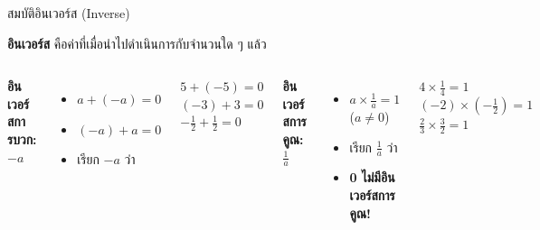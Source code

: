 \documentclass[11pt, aspectratio=169]{beamer}
\begin{document}
\begin{frame}{สมบัติอินเวอร์ส (Inverse)}
  \begin{explanation}
    \textbf{อินเวอร์ส} คือค่าที่เมื่อนำไปดำเนินการกับจำนวนใด ๆ แล้ว 
  \end{explanation}

  \begin{columns}[T]
      \textbf{อินเวอร์สการบวก: $-a$}
      \begin{itemize}
        \item $a + (-a) = 0$
        \item $(-a) + a = 0$
        \item เรียก $-a$ ว่า 
      \end{itemize}

      \begin{exambox}[ตัวอย่าง]
        $5 + (-5) = 0$ \\
        $(-3) + 3 = 0$ \\
        $-\frac{1}{2} + \frac{1}{2} = 0$
      \end{exambox}

      \textbf{อินเวอร์สการคูณ: $\frac{1}{a}$}
      \begin{itemize}
        \item $a \times \frac{1}{a} = 1$ \; ($a \neq 0$)
        \item เรียก $\frac{1}{a}$ ว่า 
        \item \textbf{0 ไม่มีอินเวอร์สการคูณ!}
      \end{itemize}

      \begin{exambox}[ตัวอย่าง]
        $4 \times \frac{1}{4} = 1$ \\
        $(-2) \times (-\frac{1}{2}) = 1$ \\
        $\frac{2}{3} \times \frac{3}{2} = 1$
      \end{exambox}
  \end{columns}
\end{frame}
\end{document}
